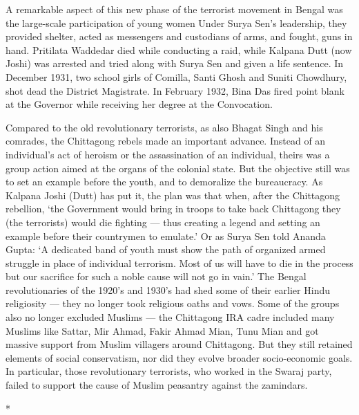 \begin{multicols}{2}
A remarkable aspect of this new phase of the terrorist movement in Bengal was the large-scale participation of young women Under Surya Sen's leadership, they provided shelter, acted as messengers and custodians of arms, and fought, guns in hand. Pritilata Waddedar died while conducting a raid, while Kalpana Dutt (now Joshi) was arrested and tried along with Surya Sen and given a life sentence. In December 1931, two school girls of Comilla, Santi Ghosh and Suniti Chowdhury, shot dead the District Magistrate. In February 1932, Bina Das fired point blank at the Governor while receiving her degree at the Convocation.

Compared to the old revolutionary terrorists, as also Bhagat Singh and his comrades, the Chittagong rebels made an important advance. Instead of an individual's act of heroism or the assassination of an individual, theirs was a group action aimed at the organs of the colonial state. But the objective still was to set an example before the youth, and to demoralize the bureaucracy. As Kalpana Joshi (Dutt) has put it, the plan was that when, after the Chittagong rebellion, `the Government would bring in troops to take back Chittagong they (the terrorists) would die fighting --- thus creating a legend and setting an example before their countrymen to emulate.' Or as Surya Sen told Ananda Gupta: `A dedicated band of youth must show the path of organized armed struggle in place of individual terrorism. Most of us will have to die in the process but our sacrifice for such a noble cause will not go in vain.' The Bengal revolutionaries of the 1920's and 1930's had shed some of their earlier Hindu religiosity --- they no longer took religious oaths and vows. Some of the groups also no longer excluded Muslims --- the Chittagong IRA cadre included many Muslims like Sattar, Mir Ahmad, Fakir Ahmad Mian, Tunu Mian and got massive support from Muslim villagers around Chittagong. But they still retained elements of social conservatism, nor did they evolve broader socio-economic goals. In particular, those revolutionary terrorists, who worked in the Swaraj party, failed to support the cause of Muslim peasantry against the zamindars.

\begin{center}*\end{center}

\paragraph*{}


\end{multicols}
